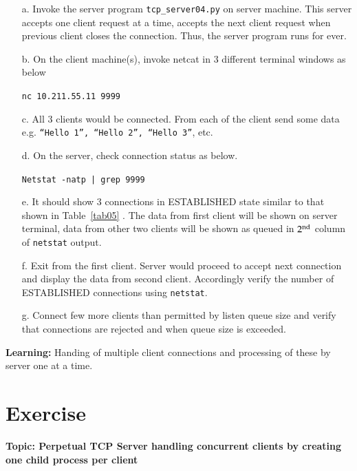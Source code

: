 \begin{multicols}{2}
\begin{itemize}
\item[a.] Invoke the server program \texttt{tcp\_server04.py} on server machine. This server accepts one client request at a time, accepts the next client request when previous client closes the connection. Thus, the server program runs for ever.

\item[b.] On the client machine(s), invoke netcat in 3 different terminal windows as below

\texttt{nc 10.211.55.11 9999}

\item[c.] All 3 clients would be connected. From each of the client send some data e.g. \texttt{“Hello 1”, “Hello 2”, “Hello 3”}, etc.

\item[d.] On the server, check connection status as below.

\texttt{Netstat -natp | grep 9999}

\item[e.] It should show 3 connections in ESTABLISHED state similar to that shown in Table~\ref{tab05} . The data from first client will be shown on server terminal, data from other two clients will be shown as queued in $2^{\rm nd}$ column of \texttt{netstat} output.

\item[f.] Exit from the first client. Server would proceed to accept next connection and display the data from second client. Accordingly verify the number of ESTABLISHED connections using \texttt{netstat}.

\item[g.] Connect few more clients than permitted by listen queue size and verify that connections are rejected and when queue size is exceeded.

\end{itemize}

\textbf{Learning:} Handing of multiple client connections and processing of these by server one at a time.

\section*{Exercise \label{chap1-exe03}}

\textbf{Topic: Perpetual TCP Server handling concurrent clients by creating one child process per client}

\begin{itemize}


\end{itemize}
\end{multicols}
